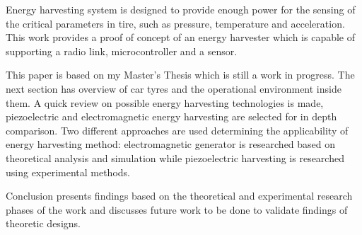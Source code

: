 Energy harvesting system is designed to provide enough power for the sensing of the critical parameters in tire, such as pressure, temperature and acceleration. This work provides a proof of concept of an energy harvester which is capable of supporting a radio link, microcontroller and a sensor. 

This paper is based on my Master's Thesis which is still a work in progress. The next section has overview of car tyres and the operational environment inside them. A quick review on possible energy harvesting technologies is made, piezoelectric and electromagnetic energy harvesting are selected for in depth comparison. Two different approaches are used determining the applicability of energy harvesting method: electromagnetic generator is researched based on theoretical analysis and simulation while piezoelectric harvesting is researched using experimental methods.

Conclusion presents findings based on the theoretical and experimental research phases of the work and discusses future work to be done to validate findings of theoretic designs. 

